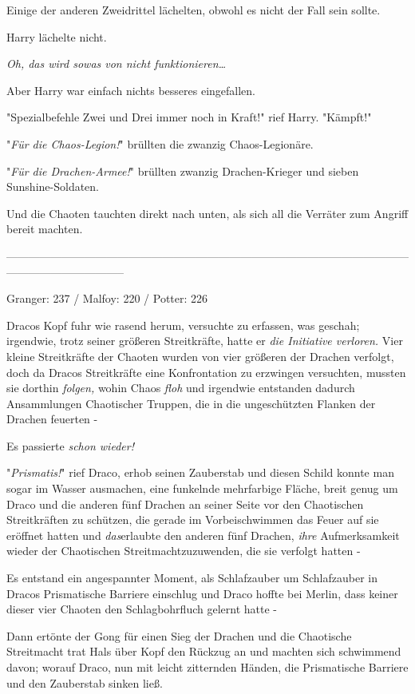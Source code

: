 {Einige der anderen Zweidrittel lächelten, obwohl es nicht der Fall sein sollte.

Harry lächelte nicht.

\emph{Oh, das wird sowas von nicht funktionieren…}

Aber Harry war einfach nichts besseres eingefallen.

"Spezialbefehle Zwei und Drei immer noch in Kraft!" rief Harry. "Kämpft!"

"\emph{Für die Chaos-Legion!}" brüllten die zwanzig Chaos-Legionäre.

"\emph{Für die Drachen-Armee!}" brüllten zwanzig Drachen-Krieger und sieben Sunshine-Soldaten.

Und die Chaoten tauchten direkt nach unten, als sich all die Verräter zum Angriff bereit machten.

--------------------------------------------------------------------------------------------------------------------------------------------

Granger: 237 / Malfoy: 220 / Potter: 226

Dracos Kopf fuhr wie rasend herum, versuchte zu erfassen, was geschah; irgendwie, trotz seiner größeren Streitkräfte, hatte er \emph{die Initiative verloren.} Vier kleine Streitkräfte der Chaoten wurden von vier größeren der Drachen verfolgt, doch da Dracos Streitkräfte eine Konfrontation zu erzwingen versuchten, mussten sie dorthin \emph{folgen,} wohin Chaos \emph{floh} und irgendwie entstanden dadurch Ansammlungen Chaotischer Truppen, die in die ungeschützten Flanken der Drachen feuerten -

Es passierte \emph{schon wieder!}

"\emph{Prismatis!}" rief Draco, erhob seinen Zauberstab und diesen Schild konnte man sogar im Wasser ausmachen, eine funkelnde mehrfarbige Fläche, breit genug um Draco und die anderen fünf Drachen an seiner Seite vor den Chaotischen Streitkräften zu schützen, die gerade im Vorbeischwimmen das Feuer auf sie eröffnet hatten und \emph{das}erlaubte den anderen fünf Drachen, \emph{ihre} Aufmerksamkeit wieder der Chaotischen Streitmachtzuzuwenden, die sie verfolgt hatten -

Es entstand ein angespannter Moment, als Schlafzauber um Schlafzauber in Dracos Prismatische Barriere einschlug und Draco hoffte bei Merlin, dass keiner dieser vier Chaoten den Schlagbohrfluch gelernt hatte -

Dann ertönte der Gong für einen Sieg der Drachen und die Chaotische Streitmacht trat Hals über Kopf den Rückzug an und machten sich schwimmend davon; worauf Draco, nun mit leicht zitternden Händen, die Prismatische Barriere und den Zauberstab sinken ließ.

}
